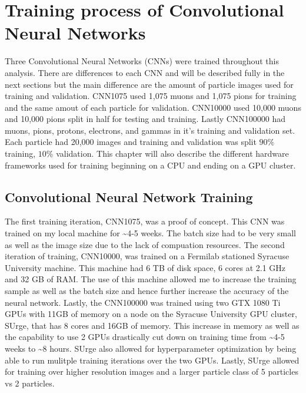 \chapter{Training process of Convolutional Neural Networks}\label{ch:cnn_train}
Three Convolutional Neural Networks (CNNs) were trained throughout this analysis. There are differences to each CNN and will be described fully in the next sections but the main difference are the amount of particle images used for training and validation. CNN1075 used 1,075 muons and 1,075 pions for training and the same amout of each particle for validation. CNN10000 used 10,000 muons and 10,000 pions split in half for testing and training. Lastly CNN100000 had muons, pions, protons, electrons, and gammas in it's training and validation set. Each particle had 20,000 images and training and validation was split $90\%$ training, $10\%$ validation. This chapter will also describe the different hardware frameworks used for training beginning on a CPU and ending on a GPU cluster. 




\section{Convolutional Neural Network Training}\label{research approach}
The first training iteration, CNN1075, was a proof of concept. This CNN was trained on my local machine for \sim 4-5 weeks. The batch size had to be very small as well as the image size due to the lack of compuation resources. The second iteration of training, CNN10000, was trained on a Fermilab stationed Syracuse University machine. This machine had 6 TB of disk space, 6 cores at 2.1 GHz and 32 GB of RAM. The use of this machine allowed me to increase the training sample as well as the batch size and hence further increase the accuracy of the neural network. Lastly, the CNN100000 was trained using two GTX 1080 Ti GPUs with 11GB of memory on a node on the Syracuse University GPU cluster, SUrge, that has 8 cores and 16GB of memory. This increase in memory as well as the capability to use 2 GPUs drastically cut down on training time from \sim 4-5 weeks to \sim 8 hours. SUrge also allowed for hyperparameter optimization by being able to run mulitple training iterations over the two GPUs. Lastly, SUrge allowed for training over higher resolution images and a larger particle class of 5 particles vs 2 particles. 
